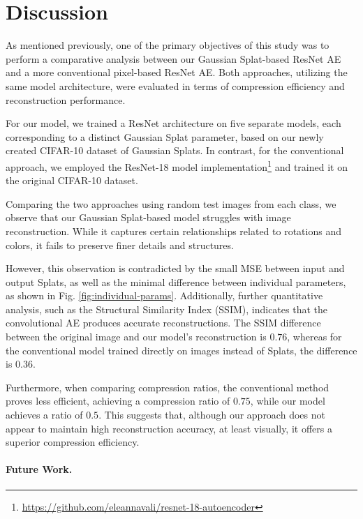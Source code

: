 \section{Discussion}
\label{sec:discussion}

As mentioned previously, one of the primary objectives of this study was to perform a comparative analysis between our Gaussian Splat-based ResNet AE and a more conventional pixel-based ResNet AE. Both approaches, utilizing the same model architecture, were evaluated in terms of compression efficiency and reconstruction performance.

For our model, we trained a ResNet architecture on five separate models, each corresponding to a distinct Gaussian Splat parameter, based on our newly created CIFAR-10 dataset of Gaussian Splats. In contrast, for the conventional approach, we employed the ResNet-18 model implementation\footnote{\url{https://github.com/eleannavali/resnet-18-autoencoder}} and trained it on the original CIFAR-10 dataset.

Comparing the two approaches using random test images from each class, we observe that our Gaussian Splat-based model struggles with image reconstruction. While it captures certain relationships related to rotations and colors, it fails to preserve finer details and structures.

However, this observation is contradicted by the small MSE between input and output Splats, as well as the minimal difference between individual parameters, as shown in Fig. \ref{fig:individual-params}. Additionally, further quantitative analysis, such as the Structural Similarity Index (SSIM), indicates that the convolutional AE produces accurate reconstructions. The SSIM difference between the original image and our model’s reconstruction is $0.76$, whereas for the conventional model trained directly on images instead of Splats, the difference is $0.36$.

Furthermore, when comparing compression ratios, the conventional method proves less efficient, achieving a compression ratio of $0.75$, while our model achieves a ratio of $0.5$. This suggests that, although our approach does not appear to maintain high reconstruction accuracy, at least visually, it offers a superior compression efficiency.

\paragraph{Future Work.}

